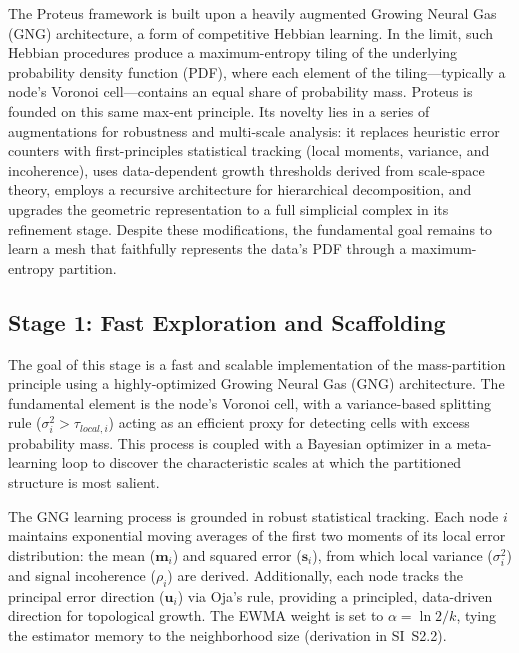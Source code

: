\documentclass[11pt]{article}
\begin{document}
The Proteus framework is built upon a heavily augmented Growing Neural Gas (GNG) architecture, a form of competitive Hebbian learning. In the limit, such Hebbian procedures produce a maximum-entropy tiling of the underlying probability density function (PDF), where each element of the tiling—typically a node's Voronoi cell—contains an equal share of probability mass. Proteus is founded on this same max-ent principle. Its novelty lies in a series of augmentations for robustness and multi-scale analysis: it replaces heuristic error counters with first-principles statistical tracking (local moments, variance, and incoherence), uses data-dependent growth thresholds derived from scale-space theory, employs a recursive architecture for hierarchical decomposition, and upgrades the geometric representation to a full simplicial complex in its refinement stage. Despite these modifications, the fundamental goal remains to learn a mesh that faithfully represents the data's PDF through a maximum-entropy partition.

\subsection{Stage 1: Fast Exploration and Scaffolding}
The goal of this stage is a fast and scalable implementation of the mass-partition principle using a highly-optimized Growing Neural Gas (GNG) architecture. The fundamental element is the node's Voronoi cell, with a variance-based splitting rule ($\sigma_i^2 > \tau_{local,i}$) acting as an efficient proxy for detecting cells with excess probability mass. This process is coupled with a Bayesian optimizer in a meta-learning loop to discover the characteristic scales at which the partitioned structure is most salient.

The GNG learning process is grounded in robust statistical tracking. Each node $i$ maintains exponential moving averages of the first two moments of its local error distribution: the mean ($\mathbf m_i$) and squared error ($\mathbf s_i$), from which local variance ($\sigma_i^2$) and signal incoherence ($\rho_i$) are derived. Additionally, each node tracks the principal error direction ($\mathbf u_i$) via Oja's rule, providing a principled, data-driven direction for topological growth. The EWMA weight is set to $\alpha = \ln 2/k$, tying the estimator memory to the neighborhood size (derivation in SI~S2.2). 
\end{document}
